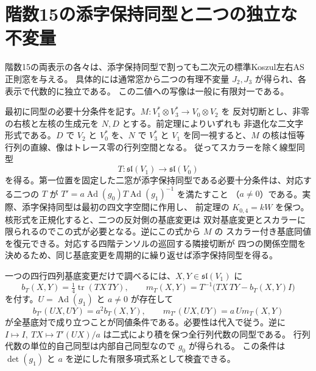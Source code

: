 \section{階数15の添字保持同型と二つの独立な不変量}
\label{sec:rank-fifteen-adjoint-invariants}
\begin{theorem}\label{thm:rank-fifteen-adjoint-invariants}
階数15の両表示の各々は、添字保持同型で割っても二次元の標準Koszul左右AS正則窓を与える。
具体的には通常窓から二つの有理不変量 $J_2,J_3$ が得られ、各表示で代数的に独立である。
この二値への写像は一般に有限対一である。
\end{theorem}

最初に同型の必要十分条件を記す。$M:V_1^*\otimes V_3^*\to V_0\otimes V_2$ を
反対切断とし、非零の右核と左核の生成元を $N,D$ とする。前定理によりいずれも
非退化な二文字形式である。$D$ で $V_2$ と $V_0^*$ を、$N$ で $V_3^*$ と $V_1$
を同一視すると、$M$ の核は恒等行列の直線、像はトレース零の行列空間となる。
従ってスカラーを除く線型同型
\[
 T:\mathfrak{sl}(V_1)\longrightarrow\mathfrak{sl}(V_0)
\]
を得る。第一位置を固定した二窓が添字保持同型である必要十分条件は、対応する二つの $T$ が
$T'=a\operatorname{Ad}(g_0)T\operatorname{Ad}(g_1)^{-1}$ を満たすこと
（$a\ne0$）である。実際、添字保持同型は最初の四文字空間に作用し、
前定理の $K_{0,4}=kW$ を保つ。核形式を正規化すると、二つの反対側の基底変更は
双対基底変更とスカラーに限られるのでこの式が必要となる。逆にこの式から $M$ の
スカラー付き基底同値を復元できる。対応する四階テンソルの巡回する隣接切断が
四つの関係空間を決めるため、同じ基底変更を周期的に繰り返せば添字保持同型を得る。

一つの四行四列基底変更だけで調べるには、$X,Y\in\mathfrak{sl}(V_1)$ に
\[
 b_T(X,Y)=\tfrac14\operatorname{tr}(TX\,TY),\qquad
 m_T(X,Y)=T^{-1}\bigl(TX\,TY-b_T(X,Y)I\bigr)
\]
を付す。$U=\operatorname{Ad}(g_1)$ と $a\ne0$ が存在して
\[
 b_{T'}(UX,UY)=a^2 b_T(X,Y),\qquad
 m_{T'}(UX,UY)=a\,U m_T(X,Y)
\]
が全基底対で成り立つことが同値条件である。必要性は代入で従う。逆に
$I\mapsto I,\ TX\mapsto T'(UX)/a$ は二式により積を保つ全行列代数の同型である。
行列代数の単位的自己同型は内部自己同型なので $g_0$ が得られる。
この条件は $\det(g_1)$ と $a$ を逆にした有限多項式系として検査できる。

